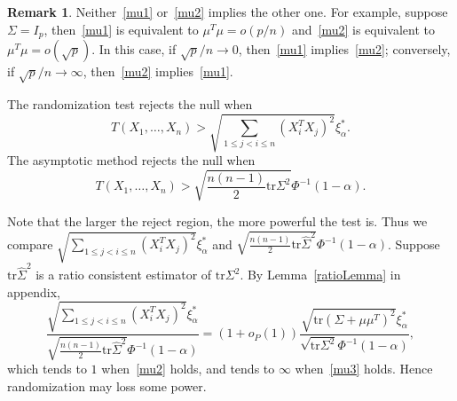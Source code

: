 \documentclass[review]{elsarticle}
\theoremstyle{plain}
\theoremstyle{definition}
\newtheorem{remark}{\quad\quad Remark}
\theoremstyle{remark}
\begin{document}

\begin{remark}
    Neither~\eqref{mu1} or~\eqref{mu2} implies the other one.
    For example, suppose $\Sigma=I_p$, then~\eqref{mu1} is equivalent to $\mu^T\mu=o(p/n)$ and~\eqref{mu2} is equivalent to $\mu^T \mu =o(\sqrt{p})$.
    In this case, if $\sqrt{p}/n\to 0$, then~\eqref{mu1} implies~\eqref{mu2}; conversely, if $\sqrt{p}/n\to \infty$, then~\eqref{mu2} implies~\eqref{mu1}.
\end{remark}


The randomization test rejects the null when 
$$
{T(X_1,\ldots, X_n)}>{\sqrt{\sum_{1\leq j<i\leq n}{(X_i^T X_j)}^2}} \xi^*_{\alpha}.
$$
The asymptotic method rejects the null when
$$
{T(X_1,\ldots, X_n)}>\sqrt{\frac{n(n-1)}{2}\mathrm{tr}\Sigma^2} \Phi^{-1}(1-\alpha).
$$

Note that the larger the reject region, the more powerful the test is. Thus we compare 
$
{\sqrt{\sum_{1\leq j<i\leq n}{(X_i^T X_j)}^2}} \xi^*_{\alpha}
$
and
$
\sqrt{\frac{n(n-1)}{2}\mathrm{tr}\hat{\Sigma}^2} \Phi^{-1}(1-\alpha)
$. Suppose $\mathrm{tr}\hat{\Sigma}^2$ is a ratio consistent estimator of $\mathrm{tr}\Sigma^2$. By Lemma~\ref{ratioLemma} in appendix,
\begin{equation*}
    \frac{{\sqrt{\sum_{1\leq j<i\leq n}{(X_i^T X_j)}^2}} \xi^*_{\alpha}}
    {\sqrt{\frac{n(n-1)}{2}\mathrm{tr}\hat{\Sigma}^2} \Phi^{-1}(1-\alpha)}=(1+o_P(1))
    \frac{{\sqrt{\mathrm{tr}{(\Sigma+\mu\mu^T)}^2}} \xi^*_{\alpha}}
    {\sqrt{\mathrm{tr}\Sigma^2} \Phi^{-1}(1-\alpha)},
\end{equation*}
which tends to $1$ when~\eqref{mu2} holds, and tends to $\infty$ when~\eqref{mu3} holds.
Hence randomization may loss some power.
\end{document}
